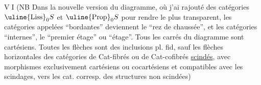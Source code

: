 \textcircled{VI} (NB Dans la nouvelle version du diagramme, où j'ai rajouté des catégories $\text{\uline{Liss}}_0 S$ et $\text{\uline{Prop}}_0 S$ pour rendre le  plus transparent, les catégories appelées ``bordantes'' deviennent le ``rez de chaussée'', et les catégories ``internes'', le ``premier étage'' ou ``étage''. Tous les  carrés du diagramme sont cartésiens. Toutes les flèches sont des inclusions pl. fid, sauf les  flèches horizontales  des catégories de Cat-fibrés ou de Cat-cofibrés \uline{scindés}, avec morphismes exclusivement cartésiens ou cocartésiens et  compatibles avec les scindages, vers les cat. corresp.  des structures non scindées)
